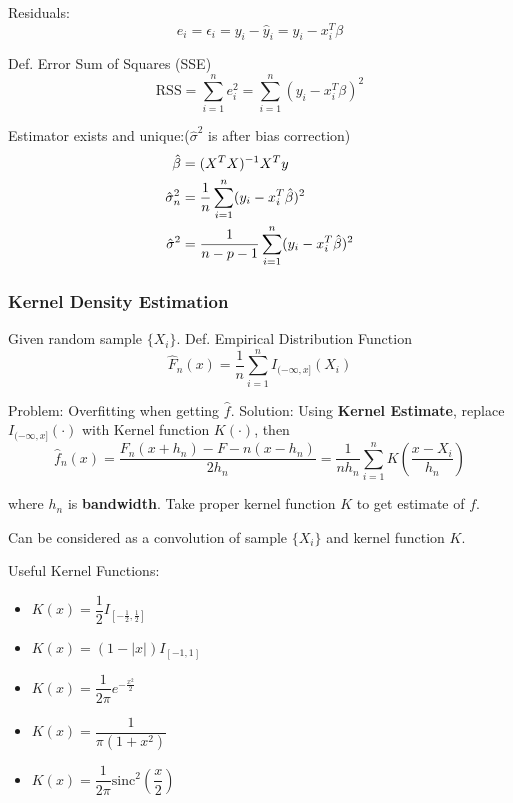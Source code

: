     Residuals:
    \[e_i=\hat{\epsilon}_i=y_i-\hat{y}_i=y_i-x_i^T\beta\]

    Def. Error Sum of Squares (SSE)
    \[\mathrm{RSS}=\sum_{i=1}^ne_i^2=\sum_{i=1}^n(y_i-x_i^T\beta)^2\]

    Estimator exists and unique:($\hat{\sigma}^2$ is after bias correction)
    \begin{align}
        \hat{\beta}&=(X^TX)^{-1}X^Ty\notag \\
        \hat{\sigma}_n^2&=\frac{1}{n}\sum_{i=1}^n(y_i-x^T_i\hat{\beta})^2 \notag\\ 
        \hat{\sigma}^2&=\frac{1}{n-p-1}\sum_{i=1}^n(y_i-x_i^T\hat{\beta})^2\label{EqaEstimatorSigmaWithDoF}
    \end{align}

    

\subsubsection{Kernel Density Estimation}\label{SubSectionKernelDensityEstimation}
    Given random sample $\{X_i\}$. Def. Empirical Distribution Function
    \begin{equation}\label{empiricaldisreibutionfunction}
        \hat{F}_n(x)=\frac{1}{n}\sum_{i=1}^nI_{(-\infty,x]}(X_i) 
    \end{equation}
        

    Problem: Overfitting when getting $\hat{f}$. Solution: Using \textbf{Kernel Estimate}, replace $I_{(-\infty,x]}(\cdot)$ with Kernel function $K(\cdot)$, then
    \[
        \hat{f}_n(x)=\dfrac{F_n(x+h_n)-F-n(x-h_n)}{2h_n}=\frac{1}{nh_n}\sum_{i=1}^nK(\frac{x-X_i}{h_n})
    \]

    where $h_n$ is \textbf{bandwidth}. Take proper kernel function $K$ to get estimate of $f$.

    Can be considered as a convolution of sample $\{X_i\}$ and kernel function $K$.

    Useful Kernel Functions:
    \begin{itemize}[itemsep= -6 pt,parsep= 0 pt]
        \item $K(x)=\dfrac{1}{2}I_{[-\frac{1}{2},\frac{1}{2}]}$\\
        \item $K(x)=(1-|x|)I_{[-1,1]}$\\
        \item $K(x)=\dfrac{1}{2\pi}e^{-\frac{x^2}{2}}$\\
        \item $K(x)=\dfrac{1}{\pi(1+x^2)}$\\
        \item $K(x)=\dfrac{1}{2\pi}\mathrm{sinc}^2(\dfrac{x}{2})$
    \end{itemize}
    










